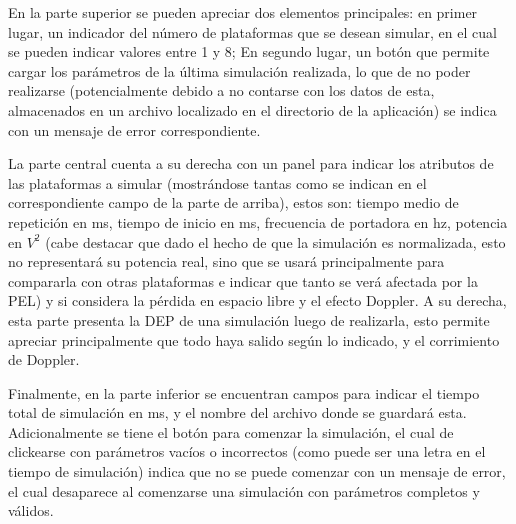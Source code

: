 \documentclass[a4paper,10pt]{article}
\begin{document}
En la parte superior se pueden apreciar dos elementos principales: en primer lugar, un indicador del número de plataformas que se desean simular, en el cual se pueden indicar valores entre 1 y 8; En segundo lugar, un botón que permite cargar los parámetros de la última simulación realizada, lo que de no poder realizarse (potencialmente debido a no contarse con los datos de esta, almacenados en un archivo localizado en el directorio de la aplicación) se indica con un mensaje de error correspondiente.
\par
La parte central cuenta a su derecha con un panel para indicar los atributos de las plataformas a simular (mostrándose tantas como se indican en el correspondiente campo de la parte de arriba), estos son: tiempo medio de repetición en ms, tiempo de inicio en ms, frecuencia de portadora en hz, potencia en $V^2$ (cabe destacar que dado el hecho de que la simulación es normalizada, esto no representará su potencia real, sino que se usará principalmente para compararla con otras plataformas e indicar que tanto se verá afectada por la PEL) y si considera la pérdida en espacio libre y el efecto Doppler. A su derecha, esta parte presenta la DEP de una simulación luego de realizarla, esto permite apreciar principalmente que todo haya salido según lo indicado, y el corrimiento de Doppler.
\par
Finalmente, en la parte inferior se encuentran campos para indicar el tiempo total de simulación en ms, y el nombre del archivo donde se guardará esta. Adicionalmente se tiene el botón para comenzar la simulación, el cual de clickearse con parámetros vacíos o incorrectos (como puede ser una letra en el tiempo de simulación) indica que no se puede comenzar con un mensaje de error, el cual desaparece al comenzarse una simulación con parámetros completos y válidos.
\end{document}
